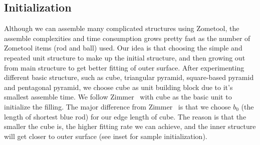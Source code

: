 \subsection{Initialization}
Although we can assemble many complicated structures using Zometool, the assemble complexities and time consumption grows pretty fast as the number of Zometool items (rod and ball) used.
Our idea is that choosing the simple and repeated unit structure to make up the initial structure, and then growing out from main structure to get better fitting of outer surface. 
After experimenting different basic structure, such as cube, triangular pyramid, square-based pyramid and pentagonal pyramid, we choose cube as unit building block due to it's smallest assemble time.
We follow Zimmer~\cite{zimmer:2014:Zometool} with cube as the basic unit to initialize the filling. 
The major difference from Zimmer~\cite{zimmer:2014:Zometool} is that we choose $b_0$ (the length of shortest blue rod) for our edge length of cube. 
The reason is that the smaller the cube is, the higher fitting rate we can achieve, and the inner structure will get closer to outer surface (see inset for sample initialization). 



